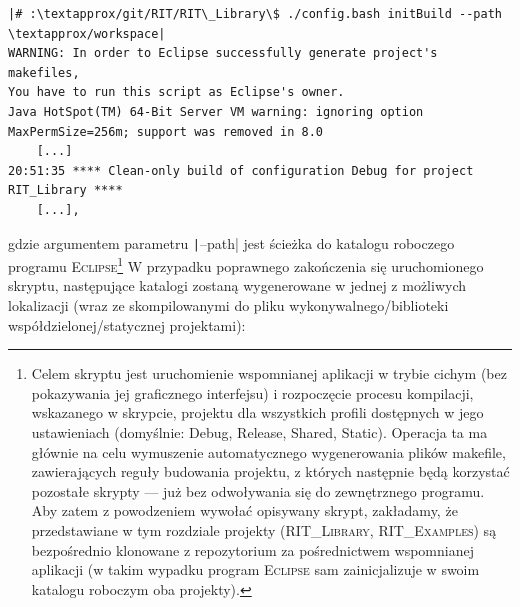 \begin{verbatim}
|# :\textapprox/git/RIT/RIT\_Library\$ ./config.bash initBuild --path \textapprox/workspace|
WARNING: In order to Eclipse successfully generate project's makefiles, 
You have to run this script as Eclipse's owner.
Java HotSpot(TM) 64-Bit Server VM warning: ignoring option MaxPermSize=256m; support was removed in 8.0
	[...]
20:51:35 **** Clean-only build of configuration Debug for project RIT_Library ****
	[...],
\end{verbatim}
gdzie argumentem parametru \texttt|--path| jest ścieżka do katalogu roboczego programu \textsc{Eclipse}\footnote{Celem skryptu jest uruchomienie wspomnianej aplikacji w trybie cichym (bez pokazywania jej graficznego interfejsu) i rozpoczęcie procesu kompilacji, wskazanego w skrypcie, projektu dla wszystkich profili dostępnych w jego ustawieniach (domyślnie: \textsf{Debug}, \textsf{Release}, \textsf{Shared}, \textsf{Static}). Operacja ta ma głównie na celu wymuszenie automatycznego wygenerowania plików \textsf{makefile}, zawierających reguły budowania projektu, z których następnie będą korzystać pozostałe skrypty --- już bez odwoływania się do zewnętrznego programu. Aby zatem z powodzeniem wywołać opisywany skrypt, zakładamy, że przedstawiane w tym rozdziale projekty (\textsc{RIT\_Library}, \textsc{RIT\_Examples}) są bezpośrednio klonowane z repozytorium za pośrednictwem wspomnianej aplikacji (w takim wypadku program \textsc{Eclipse} sam zainicjalizuje w swoim katalogu roboczym oba projekty).} W przypadku poprawnego zakończenia się uruchomionego skryptu, następujące katalogi zostaną wygenerowane w jednej z możliwych lokalizacji (wraz ze skompilowanymi do pliku wykonywalnego/biblioteki współdzielonej/statycznej projektami):

